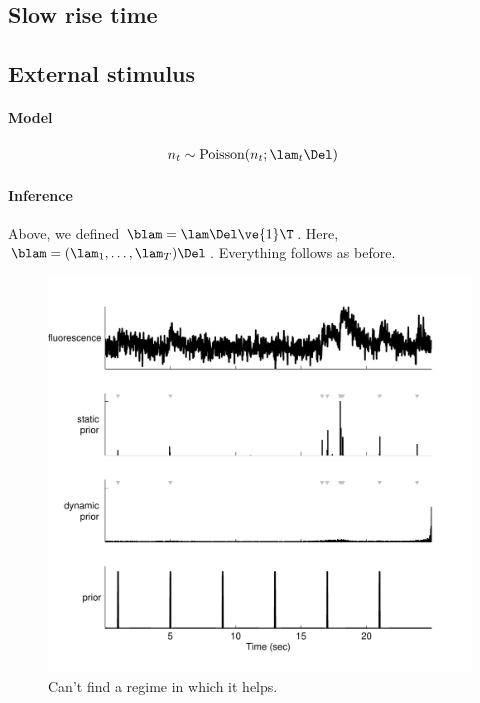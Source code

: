 \subsection{Slow rise time}

\subsection{External stimulus}

\paragraph{Model}


\begin{align}
	n_t &\sim \text{Poisson}(n_t; \lam_t \Del)
\end{align}

\paragraph{Inference}

Above, we defined $\blam=\lam\Del\ve{1}\T$.  Here, $\blam=(\lam_1, \ldots, \lam_T) \Del$.  Everything follows as before.

\begin{figure}[h!]
\centering \includegraphics[width=.9\linewidth]{../figs/dynamic_prior}
\caption{Can't find a regime in which it helps.} \label{fig:woopsi}
\end{figure}


